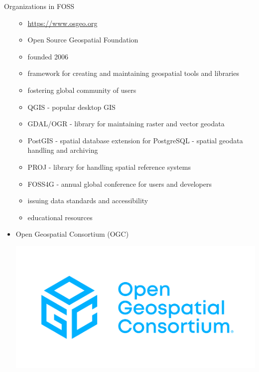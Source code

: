 \documentclass{beamer}
\begin{document}
\begin{frame}[allowframebreaks]{Organizations in FOSS}
\begin{itemize}
                    \begin{itemize}
                        \item \url{https://www.osgeo.org}
                        \item Open Source Geospatial Foundation
                        \item founded 2006
                        \item framework for creating and maintaining geospatial tools and libraries
                        \item fostering global community of users
                        \item QGIS - popular desktop GIS
                        \item GDAL/OGR - library for maintaining raster and vector geodata
                        \item PostGIS - spatial database extension for PostgreSQL - spatial geodata handling and archiving
                        \item PROJ - library for handling spatial reference systems
                        \item FOSS4G - annual global conference for users and developers
                        \item issuing data standards and accessibility
                        \item educational resources
                    \end{itemize}

                    

                \item Open Geospatial Consortium (OGC) \hfill
                    \begin{minipage}[t]{0.25\textwidth}
                        \includegraphics[scale=0.04]{figs/ogc.png}
                    \end{minipage}


\end{itemize}
\end{frame}
\end{document}
